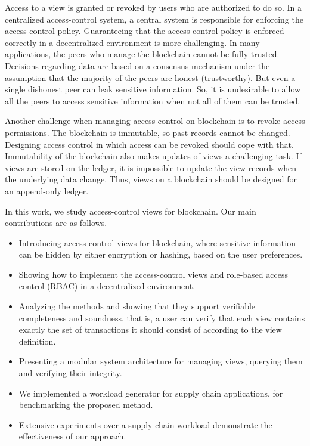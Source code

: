 Access to a view is granted or revoked by users who are authorized to do so. In a centralized access-control system, a central system is responsible for enforcing the access-control policy. Guaranteeing that the access-control policy is enforced correctly in a decentralized environment is more challenging. In many applications, the peers who manage the blockchain cannot be fully trusted. Decisions regarding data are based on a consensus mechanism under the assumption that the majority of the peers are honest (trustworthy). But even a single dishonest peer can leak sensitive information. So, it is undesirable to allow all the peers to access sensitive information when not all of them can be trusted.

Another challenge when managing access control on blockchain is to revoke access permissions. The blockchain is immutable, so past records cannot be changed. Designing access control in which access can be revoked should cope with that.
%
Immutability of the blockchain also makes updates of views a challenging task. If views are stored on the ledger, it is impossible to update the view records when the underlying data change. Thus, views on a blockchain should be designed for an append-only ledger. 

In this work, we study access-control views for blockchain. Our main contributions are as follows.
\begin{itemize}
    \item Introducing access-control views for blockchain, where sensitive information can be hidden by either encryption or hashing, based on the user preferences.
    \item Showing how to implement the access-control views and role-based access control (RBAC) in a decentralized environment.
    \item Analyzing the methods and showing that they support verifiable completeness and soundness, that is, a user can verify that each view contains exactly the set of transactions it should consist of according to the view definition.
    \item Presenting a modular system architecture for managing views, querying them and verifying their integrity.
    \item We implemented a workload generator for supply chain applications, for benchmarking the proposed method. 
    \item Extensive experiments over a supply chain workload demonstrate the effectiveness of our approach.
\end{itemize}


